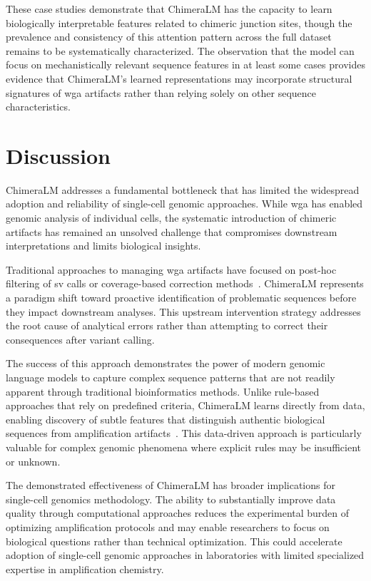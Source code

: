 \documentclass[pdflatex,sn-nature]{sn-jnl}%
\theoremstyle{thmstyleone}%
\theoremstyle{thmstyletwo}%
\theoremstyle{thmstylethree}%
\begin{document}
These case studies demonstrate that ChimeraLM has the capacity to learn biologically interpretable features related to chimeric junction sites, though the prevalence and consistency of this attention pattern across the full dataset remains to be systematically characterized.
The observation that the model can focus on mechanistically relevant sequence features in at least some cases provides evidence that ChimeraLM's learned representations may incorporate structural signatures of \gls{wga} artifacts rather than relying solely on other sequence characteristics.

\section*{Discussion}
ChimeraLM addresses a fundamental bottleneck that has limited the widespread adoption and reliability of single-cell genomic approaches.
While \gls{wga} has enabled genomic analysis of individual cells, the systematic introduction of chimeric artifacts has remained an unsolved challenge that compromises downstream interpretations and limits biological insights.

Traditional approaches to managing \gls{wga} artifacts have focused on post-hoc filtering of \gls{sv} calls or coverage-based correction methods~\cite{kiguchi2021long, lu2023exploration}.
ChimeraLM represents a paradigm shift toward proactive identification of problematic sequences before they impact downstream analyses.
This upstream intervention strategy addresses the root cause of analytical errors rather than attempting to correct their consequences after variant calling.

The success of this approach demonstrates the power of modern genomic language models to capture complex sequence patterns that are not readily apparent through traditional bioinformatics methods.
Unlike rule-based approaches that rely on predefined criteria, ChimeraLM learns directly from data, enabling discovery of subtle features that distinguish authentic biological sequences from amplification artifacts~\cite{lu2023exploration, agyabeng2025evaluating, nguyen2023hyenadna}.
This data-driven approach is particularly valuable for complex genomic phenomena where explicit rules may be insufficient or unknown.

The demonstrated effectiveness of ChimeraLM has broader implications for single-cell genomics methodology.
The ability to substantially improve data quality through computational approaches reduces the experimental burden of optimizing amplification protocols and may enable researchers to focus on biological questions rather than technical optimization.
This could accelerate adoption of single-cell genomic approaches in laboratories with limited specialized expertise in amplification chemistry.
\end{document}
